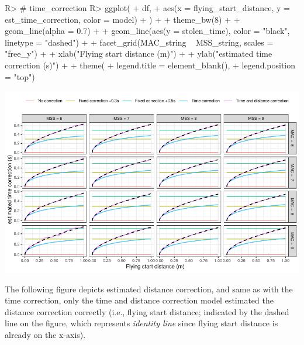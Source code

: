 \documentclass[
]{jss}
\begin{document}
\begin{CodeChunk}
\begin{CodeInput}
R> # time_correction
R> ggplot(
+   df,
+   aes(x = flying_start_distance, y = est_time_correction, color = model)
+ ) +
+   theme_bw(8) +
+   geom_line(alpha = 0.7) +
+   geom_line(aes(y = stolen_time), color = "black", linetype = "dashed") +
+   facet_grid(MAC_string ~ MSS_string, scales = "free_y") +
+   xlab("Flying start distance (m)") +
+   ylab("estimated time correction (s)")  +
+   theme(
+     legend.title = element_blank(),
+     legend.position = "top")
\end{CodeInput}


\begin{center}\includegraphics[width=1\linewidth]{paper_files/figure-latex/unnamed-chunk-35-1} \end{center}

\end{CodeChunk}

The following figure depicts estimated distance correction, and same as with the time correction, only the time and distance correction model estimated the distance correction correctly (i.e., flying start distance; indicated by the dashed line on the figure, which represents \emph{identity line} since flying start distance is already on the x-axis).
\end{document}
